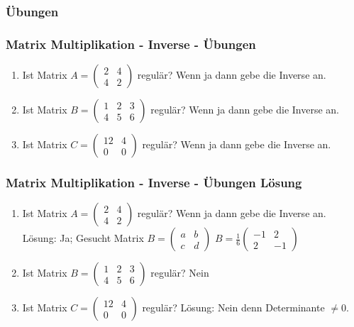 \subsubsection{Übungen}
\begin{frame}
\frametitle{Matrix Multiplikation - Inverse - Übungen}
\begin{enumerate}
\item Ist Matrix $A = \begin{pmatrix} 2 & 4 \\ 4 & 2 \end{pmatrix}$ regulär? Wenn ja dann gebe die Inverse an.
\item Ist Matrix $B = \begin{pmatrix} 1 & 2 & 3 \\ 4 & 5 & 6 \end{pmatrix}$ regulär? Wenn ja dann gebe die Inverse an.
\item Ist Matrix $C = \begin{pmatrix} 12 & 4 \\ 0 & 0  \end{pmatrix}$ regulär? Wenn ja dann gebe die Inverse an.
\end{enumerate}
\end{frame}

\begin{frame}
\frametitle{Matrix Multiplikation - Inverse - Übungen Lösung}
\begin{enumerate}
\item Ist Matrix $A = \begin{pmatrix} 2 & 4 \\ 4 & 2 \end{pmatrix}$ regulär? Wenn ja dann gebe die Inverse an. \\
Lösung: Ja; Gesucht Matrix $B = \begin{pmatrix} a & b \\ c & d \end{pmatrix}$
$B = \frac{1}{6}\begin{pmatrix} -1 & 2 \\ 2 & -1 \end{pmatrix}$
\item Ist Matrix $B = \begin{pmatrix} 1 & 2 & 3 \\ 4 & 5 & 6 \end{pmatrix}$ regulär? Nein
\item  Ist Matrix $C = \begin{pmatrix} 12 & 4 \\ 0 & 0  \end{pmatrix}$ regulär?
Lösung: Nein denn Determinante $\neq 0$.
\end{enumerate}
\end{frame}

